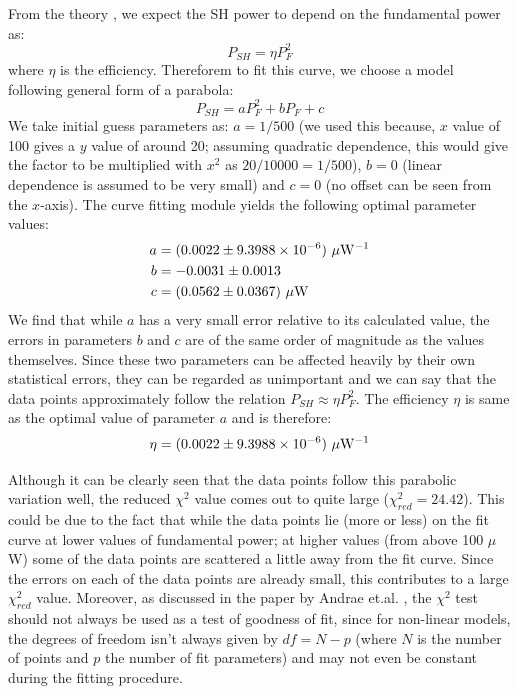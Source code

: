 From the theory \cite{yarivqm}, we expect the SH power to depend on the fundamental power as: 
\begin{equation}
P_{SH}=\eta P_{F}^{2}
\end{equation}
where $\eta$ is the efficiency.
Thereforem to fit this curve, we choose a model following general form of a parabola:
\begin{equation}
P_{SH}=aP_{F}^{2}+bP_{F}+c
\end{equation}
We take initial guess parameters as: $a=1/500$ (we used this because, $x$ value of 100 gives a $y$ value of around 20; assuming quadratic dependence, this would give the factor to be multiplied with $x^{2}$ as $20/10000=1/500$), $b=0$ (linear dependence is assumed to be very small) and $c=0$ (no offset can be seen from the $x$-axis). The curve fitting module yields the following optimal parameter values:
\begin{align*}
a&=(0.0022\pm 9.3988\times 10^{-6})\ \mu\rm{W}^{-1}\\
b&=-0.0031\pm 0.0013\\
c&=(0.0562\pm 0.0367)\ \mu\rm{W}
\end{align*}  
We find that while $a$ has a very small error relative to its calculated value, the errors in parameters $b$ and $c$ are of the same order of magnitude as the values themselves. Since these two parameters can be affected heavily by their own statistical errors, they can be regarded as unimportant and we can say that the data points approximately follow the relation $P_{SH}\approx\eta P_{F}^{2}$. The efficiency $\eta$ is same as the optimal value of parameter $a$ and is therefore: 
\begin{equation}
\eta=(0.0022\pm 9.3988\times 10^{-6})\ \mu\rm{W}^{-1}
\end{equation}

Although it can be clearly seen that the data points follow this parabolic variation well, the reduced $\chi^{2}$ value comes out to quite large ($\chi_{red}^{2}=24.42$). This could be due to the fact that while the data points lie (more or less) on the fit curve at lower values of fundamental power; at higher values (from above 100 $\mu$W) some of the data points are scattered a little away from the fit curve. Since the errors on each of the data points are already small, this contributes to a large $\chi_{red}^{2}$ value. Moreover, as discussed in the paper by Andrae et.al. \cite{https://doi.org/10.48550/arxiv.1012.3754}, the $\chi^{2}$ test should not always be used as a test of goodness of fit, since for non-linear models, the degrees of freedom isn't always given by $df=N-p$ (where $N$ is the number of points and $p$ the number of fit parameters) and may not even be constant during the fitting procedure. 

